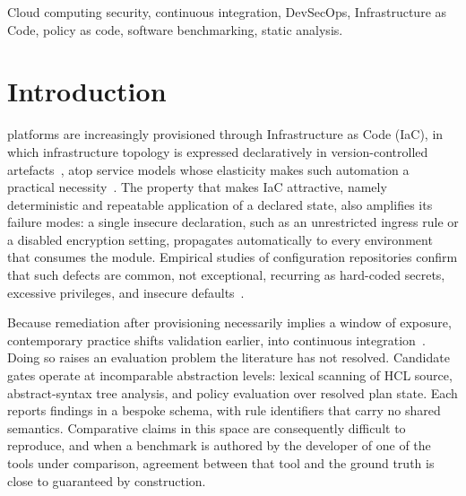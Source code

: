 \documentclass[journal]{IEEEtran}
\begin{document}
\begin{abstract}
state its criterion is not reproducible at any corpus size. And the reference
pipeline does not lead the comparison: a third-party scanner attains the highest
control-level recall, which we report as measured. Detection effectiveness is
reported with exact Clopper-Pearson intervals, and pairwise differences with
exact binomial tests under family-wise correction; no pairwise difference
survives correction, which the interval widths explain. We further report a
mechanically enforced corpus admissibility procedure that rejects cases which
cannot support a defensible ground-truth label. The corpus, normalization engine,
execution harness, and analysis code are released as a replication package.
\end{abstract}

\begin{IEEEkeywords}
Cloud computing security, continuous integration, DevSecOps, Infrastructure as
Code, policy as code, software benchmarking, static analysis.
\end{IEEEkeywords}

\section{Introduction}
 platforms are increasingly provisioned through
Infrastructure as Code (IaC), in which infrastructure topology is expressed
declaratively in version-controlled artefacts~\cite{morris2020infrastructure,
guerriero2019adoption}, atop service models whose elasticity makes such
automation a practical necessity~\cite{armbrust2010view}. The property that
makes IaC attractive, namely deterministic and repeatable application of a
declared state, also amplifies its failure modes: a
single insecure declaration, such as an unrestricted ingress rule or a disabled
encryption setting, propagates automatically to every environment that consumes
the module. Empirical studies of configuration repositories confirm that such
defects are common, not exceptional, recurring as hard-coded secrets,
excessive privileges, and insecure defaults~\cite{rahman2019sins,
rahman2021replication, verdet2023exploring, verdet2025adoption}.

Because remediation after provisioning necessarily implies a window of exposure,
contemporary practice shifts validation earlier, into continuous
integration~\cite{bass2015devops, humble2010continuous}. Doing so raises an
evaluation problem the literature has not resolved. Candidate gates operate at
incomparable abstraction levels: lexical scanning of HCL source, abstract-syntax
tree analysis, and policy evaluation over resolved plan state. Each reports
findings in a bespoke schema, with rule identifiers that carry no shared
semantics. Comparative claims in this space are consequently difficult to
reproduce, and when a benchmark is authored by the developer of one of the tools
under comparison, agreement between that tool and the ground truth is close to
guaranteed by construction.
\end{document}
